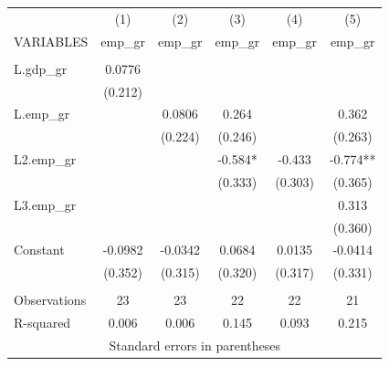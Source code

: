 \documentclass{article}
\begin{document}
\begin{center}
\resizebox{10cm}{!}
{
\begin{tabular}{lccccc} \hline
    & (1) & (2) & (3) & (4) & (5) \\
    VARIABLES & emp\_gr & emp\_gr & emp\_gr & emp\_gr & emp\_gr \\ \hline
    &  &  &  &  &  \\
    L.gdp\_gr & 0.0776 &  &  &  &  \\
    & (0.212) &  &  &  &  \\
    L.emp\_gr &  & 0.0806 & 0.264 &  & 0.362 \\
    &  & (0.224) & (0.246) &  & (0.263) \\
    L2.emp\_gr &  &  & -0.584* & -0.433 & -0.774** \\
    &  &  & (0.333) & (0.303) & (0.365) \\
    L3.emp\_gr &  &  &  &  & 0.313 \\
    &  &  &  &  & (0.360) \\
    Constant & -0.0982 & -0.0342 & 0.0684 & 0.0135 & -0.0414 \\
    & (0.352) & (0.315) & (0.320) & (0.317) & (0.331) \\
    &  &  &  &  &  \\
    Observations & 23 & 23 & 22 & 22 & 21 \\
    R-squared & 0.006 & 0.006 & 0.145 & 0.093 & 0.215 \\ \hline
    \multicolumn{6}{c}{ Standard errors in parentheses} \\
\end{tabular}
}
\end{center}

\vspace{0.4cm}
\end{document}
